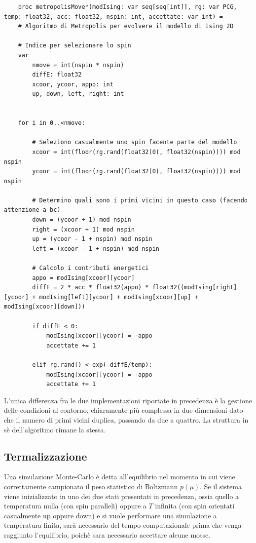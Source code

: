 \begin{verbatim}
    proc metropolisMove*(modIsing: var seq[seq[int]], rg: var PCG, temp: float32, acc: float32, nspin: int, accettate: var int) = 
    # Algoritmo di Metropolis per evolvere il modello di Ising 2D

    # Indice per selezionare lo spin
    var 
        nmove = int(nspin * nspin)
        diffE: float32
        xcoor, ycoor, appo: int
        up, down, left, right: int


    for i in 0..<nmove:

        # Seleziono casualmente uno spin facente parte del modello
        xcoor = int(floor(rg.rand(float32(0), float32(nspin)))) mod nspin
        ycoor = int(floor(rg.rand(float32(0), float32(nspin)))) mod nspin

        # Determino quali sono i primi vicini in questo caso (facendo attenzione a bc)
        down = (ycoor + 1) mod nspin
        right = (xcoor + 1) mod nspin
        up = (ycoor - 1 + nspin) mod nspin
        left = (xcoor - 1 + nspin) mod nspin

        # Calcolo i contributi energetici
        appo = modIsing[xcoor][ycoor]
        diffE = 2 * acc * float32(appo) * float32((modIsing[right][ycoor] + modIsing[left][ycoor] + modIsing[xcoor][up] + modIsing[xcoor][down]))

        if diffE < 0:
            modIsing[xcoor][ycoor] = -appo
            accettate += 1

        elif rg.rand() < exp(-diffE/temp):
            modIsing[xcoor][ycoor] = -appo
            accettate += 1
\end{verbatim}    

L'unica differenza fra le due implementazioni riportate in precedenza è la gestione delle condizioni al 
contorno, chiaramente più complessa in due dimensioni dato che il numero di primi vicini duplica, passando 
da due a quattro. La struttura in sè dell'algoritmo rimane la stessa. 





\subsection{Termalizzazione}

Una simulazione Monte-Carlo è detta all'equilibrio nel momento in cui viene correttamente campionato il peso statistico di Boltzmann 
$p\left(\mu\right)$. Se il sistema viene inizializzato in uno dei due stati presentati in precedenza, ossia quello a temperatura 
nulla (con spin paralleli) oppure a $T$ infinita (con spin orientati casualmente up oppure down) e si vuole performare una simulazione a 
temperatura finita, sarà necessario del tempo computazionale prima che venga raggiunto l'equilibrio, poichè sara necessario accettare 
alcune mosse.

